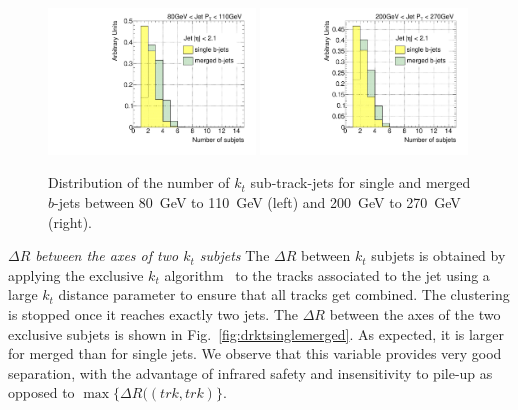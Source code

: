 \begin{figure}[tp]
\centering
\includegraphics[width=0.49\textwidth]{FIGS/VarsSingleMerged/Nsubjets080.pdf}
\includegraphics[width=0.49\textwidth]{FIGS/VarsSingleMerged/Nsubjets200.pdf}
\caption{Distribution of the number of $k_t$ sub-track-jets for single and merged $b$-jets between 80~GeV to 110~GeV (left) and 200~GeV to 270~GeV (right).}
\label{fig:nsubjetsinglemerged}
\end{figure}



{ \em $\Delta R$ between the axes of two $k_t$ subjets}  The $\Delta R$ between $k_t$ subjets is obtained by applying the exclusive $k_t$ algorithm~\cite{exclusivekt} to the tracks associated to the jet using a large $k_t$ distance parameter to ensure that all tracks get combined. The clustering is stopped once it reaches exactly two jets. The $\Delta R$ between the axes of the two exclusive subjets is shown in Fig.~\ref{fig:drktsinglemerged}.  As expected, it is larger for merged than for single jets. We observe that this
variable provides very good separation, with the advantage of infrared safety and insensitivity to pile-up as opposed to $\max\{\Delta R((trk,trk)\}$.

